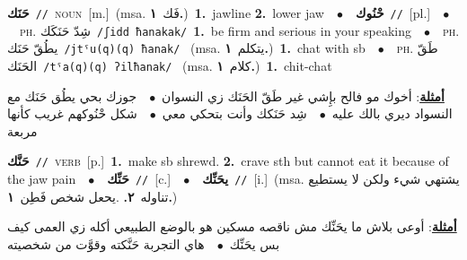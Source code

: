 \documentclass[10pt,a4paper,twoside]{article} %
\begin{document}
\begin{multicols}{2}
{\setlength\topsep{0pt}\textbf{\foreignlanguage{arabic}{حَنَك}}\ {\color{gray}\texttt{//}\color{black}}\ \textsc{noun}\ [m.]\ \color{gray}(msa. \foreignlanguage{arabic}{فَك}~\foreignlanguage{arabic}{\textbf{١.}})\color{black}\ \textbf{1.}~jawline  \textbf{2.}~lower jaw\ \ $\bullet$\ \ \setlength\topsep{0pt}\textbf{\foreignlanguage{arabic}{حْنُوك}}\ {\color{gray}\texttt{//}\color{black}}\ [pl.]\ \ $\bullet$\ \ \textsc{ph.} \color{gray} \foreignlanguage{arabic}{شِدّ حَنَكَك}\color{black}\ {\color{gray}\texttt{/{\sffamily ʃidd ħanakak}/}\color{black}}\ \textbf{1.}~be firm and serious in your speaking\ \ $\bullet$\ \ \textsc{ph.} \color{gray} \foreignlanguage{arabic}{يطُقّ حَنَك}\color{black}\ {\color{gray}\texttt{/{\sffamily jtˤu(q)(q) ħanak}/}\color{black}}\ \color{gray} (msa. \foreignlanguage{arabic}{يتكلم}~\foreignlanguage{arabic}{\textbf{١.}})\color{black}\ \textbf{1.}~chat with sb\ \ $\bullet$\ \ \textsc{ph.} \color{gray} \foreignlanguage{arabic}{طَقّ الحَنَك}\color{black}\ {\color{gray}\texttt{/{\sffamily tˤa(q)(q) ʔilħanak}/}\color{black}}\ \color{gray} (msa. \foreignlanguage{arabic}{كلام}~\foreignlanguage{arabic}{\textbf{١.}})\color{black}\ \textbf{1.}~chit-chat\  \begin{flushright}\color{gray}\foreignlanguage{arabic}{\textbf{\underline{\foreignlanguage{arabic}{أمثلة}}}: أخوك مو فالح بإِشي غير طَقّ الحَنَك زي النسوان\ $\bullet$\ \  جوزك بحي يطُق حَنَك مع النسواد ديري بالك عليه\ $\bullet$\ \  شِد حَنَكك وأنت بتحكي معي\ $\bullet$\ \  شكل حْنُوكهم غريب كأنها مربعة}\end{flushright}\color{black}} \vspace{2mm}

{\setlength\topsep{0pt}\textbf{\foreignlanguage{arabic}{حَنَّك}}\ {\color{gray}\texttt{//}\color{black}}\ \textsc{verb}\ [p.]\ \textbf{1.}~make sb shrewd.  \textbf{2.}~crave sth but cannot eat it because of the jaw pain\ \ $\bullet$\ \ \setlength\topsep{0pt}\textbf{\foreignlanguage{arabic}{حَنِّك}}\ {\color{gray}\texttt{//}\color{black}}\ [c.]\ \ $\bullet$\ \ \setlength\topsep{0pt}\textbf{\foreignlanguage{arabic}{يحَنِّك}}\ {\color{gray}\texttt{//}\color{black}}\ [i.]\ \color{gray}(msa. \foreignlanguage{arabic}{يشتهي شيء ولكن لا يستطيع تناوله}~\foreignlanguage{arabic}{\textbf{٢.}}  .\foreignlanguage{arabic}{يحعل شخص فَطِن}~\foreignlanguage{arabic}{\textbf{١.}})\color{black}\  \begin{flushright}\color{gray}\foreignlanguage{arabic}{\textbf{\underline{\foreignlanguage{arabic}{أمثلة}}}: أوعى بلاش ما يحَنِّك مش ناقصه مسكين هو بالوضع الطبيعي أكله زي العمى كيف بس يحَنِّك\ $\bullet$\ \  هاي التجربة حَنَّكته وقوَّت من شخصيته}\end{flushright}\color{black}} \vspace{2mm}


\end{multicols}
\end{document}
